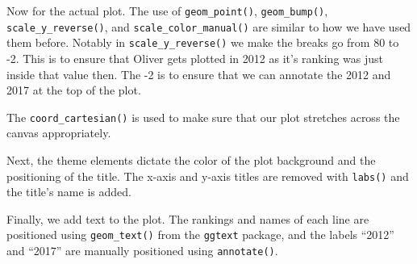 \documentclass[
  letterpaper,
  DIV=11,
  numbers=noendperiod]{scrreprt}
\begin{document}
Now for the actual plot. The use of \texttt{geom\_point()},
\texttt{geom\_bump()}, \texttt{scale\_y\_reverse()}, and
\texttt{scale\_color\_manual()} are similar to how we have used them
before. Notably in \texttt{scale\_y\_reverse()} we make the breaks go
from 80 to -2. This is to ensure that Oliver gets plotted in 2012 as
it's ranking was just inside that value then. The -2 is to ensure that
we can annotate the 2012 and 2017 at the top of the plot.

The \texttt{coord\_cartesian()} is used to make sure that our plot
stretches across the canvas appropriately.

Next, the theme elements dictate the color of the plot background and
the positioning of the title. The x-axis and y-axis titles are removed
with \texttt{labs()} and the title's name is added.

Finally, we add text to the plot. The rankings and names of each line
are positioned using \texttt{geom\_text()} from the \texttt{ggtext}
package, and the labels ``2012'' and ``2017'' are manually positioned
using \texttt{annotate()}.
\end{document}
